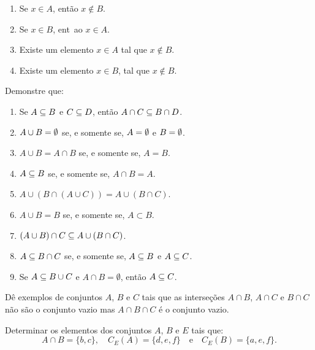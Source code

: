 \documentclass[12pt]{exam}
\begin{document}
    \begin{enumerate}[label={\roman*})]
        \item Se $x \in A$, então $x \notin B$.

        \item Se $x \in B$, ent~ao $x \in A$.

        \item Existe um elemento $x \in A$ tal que $x \notin B$.

        \item Existe um elemento $x \in B$, tal que $x \notin B$.
    \end{enumerate}
    \questao{} Demonstre que:
    \begin{enumerate}[label={\alph*})]
        \item Se $A \subseteq B$ e $C \subseteq D$, ent\~ao $A \cap C \subseteq B \cap D$.

        \item $A \cup B = \emptyset$ se, e somente se, $A = \emptyset$ e $B = \emptyset$.

        \item $A \cup B = A \cap B$ se, e somente se,  $A = B$.

        \item $A \subseteq B$ se, e somente se,  $A \cap B = A$.

        \item $A \cup (B \cap (A \cup C)) = A \cup (B \cap C)$.

        \item $A \cup B = B$ se, e somente se, $A \subset B$.

        \item $(A \cup B) \cap C \subseteq A \cup (B \cap C)$.

        \item $A \subseteq B \cap C$ se, e somente se, $A \subseteq B$ e $A \subseteq C$.

        \item Se $A \subseteq B \cup C$ e $A \cap B = \emptyset$, então $A \subseteq C$.
    \end{enumerate}

    \questao{} Dê exemplos de conjuntos $A$, $B$ e $C$ tais que as interseções $A \cap B$, $A \cap C$ e $B \cap C$ não são o conjunto vazio mas $A \cap B \cap C$ é o conjunto vazio.

    \vspace{.3cm}

    \questao{} Determinar os elementos dos conjuntos $A$, $B$ e $E$ tais que:
    \[
        A \cap B = \{b, c\}, \quad C_E(A) = \{d, e, f\} \quad \mbox{e}\quad C_E(B) = \{a          , e, f\}.
    \]
\end{document}
